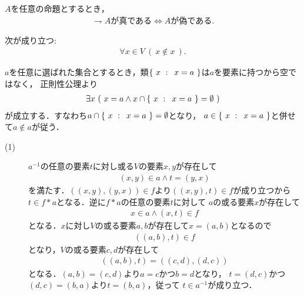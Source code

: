 	\begin{screen}
		\begin{thm}
			$A$を任意の命題とするとき，
			\begin{align}
				\mbox{$\rightharpoondown A$が真である} \Longleftrightarrow \mbox{$A$が偽である}.
			\end{align}
		\end{thm}
	\end{screen}
	
	\begin{screen}
		\begin{thm}[いかなる集合も自分自身を要素に持たない]
			次が成り立つ:
			\begin{align}
				\forall x \in V\ (\ x \notin x\ ).
			\end{align}
		\end{thm}
	\end{screen}
	
	\begin{prf}
		$a$を任意に選ばれた集合とするとき，類$\left\{\ x\, \, : \, \, \, x=a\ \right\}$は$a$を要素に持つから空ではなく，
		正則性公理より
		\begin{align}
			\exists x\ (\ x = a \wedge x \cap \Set{x}{x=a} = \emptyset\ )
		\end{align}
		が成立する．すなわち$a \cap \left\{\ x\, \, : \, \, \, x=a\ \right\} = \emptyset$となり，
		$a \in \left\{\ x\, \, : \, \, \, x=a\ \right\}$と併せて$a \notin a$が従う．
		\QED
	\end{prf}
	
	\begin{screen}
		\begin{thm}
			
		\end{thm}
	\end{screen}
	
	\begin{prf}\mbox{}
		\begin{description}
			\item[(1)] $a^{-1}$の任意の要素$t$に対し或る$V$の要素$x,y$が存在して
				\begin{align}
					(x,y) \in a \wedge t = (y,x)
				\end{align}
				を満たす．$((x,y),(y,x)) \in f$より$((x,y),t) \in f$が成り立つから
				$t \in f \ast a$となる．逆に$f \ast a$の任意の要素$t$に対して
				$a$の或る要素$x$が存在して
				\begin{align}
					x \in a \wedge (x,t) \in f
				\end{align}
				となる．$x$に対し$V$の或る要素$a,b$が存在して$x=(a,b)$となるので
				\begin{align}
					((a,b),t) \in f
				\end{align}
				となり，$V$の或る要素$c,d$が存在して
				\begin{align}
					((a,b),t) = ((c,d),(d,c))
				\end{align}
				となる．$(a,b) = (c,d)$より$a=c$かつ$b=d$となり，
				$t = (d,c)$かつ$(d,c)=(b,a)$より$t=(b,a)$，従って
				$t \in a^{-1}$が成り立つ．
		\end{description}
	\end{prf}